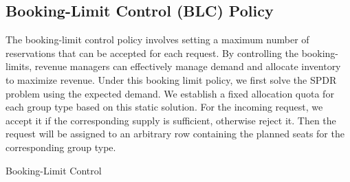 \subsection{Booking-Limit Control (BLC) Policy}
The booking-limit control policy involves setting a maximum number of reservations that can be accepted for each request. By controlling the booking-limits, revenue managers can effectively manage demand and allocate inventory to maximize revenue. 
Under this booking limit policy, we first solve the SPDR problem using the expected demand. We establish a fixed allocation quota for each group type based on this static solution. For the incoming request, we accept it if the corresponding supply is sufficient, otherwise reject it. Then the request will be assigned to an arbitrary row containing the planned seats for the corresponding group type.





\begin{algorithm}[H]
  \caption{Booking-Limit Control}\label{algo_booking}
\end{algorithm}




